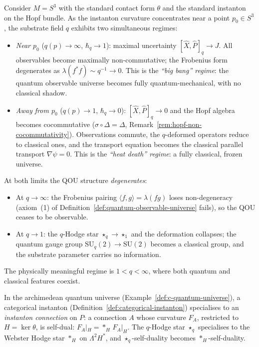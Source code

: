 \begin{example}
\label{ex:cosmological-limits}
Consider $M = S^3$ with the standard contact form $\theta$ and the
standard instanton on the Hopf bundle.  As the instanton curvature
concentrates near a point $p_0 \in S^3$, the substrate field $q$
exhibits two simultaneous regimes:
\begin{itemize}
  \item \emph{Near $p_0$} ($q(p) \to \infty$, $\hbar_q \to 1$):
        maximal uncertainty $[\hat{X},\hat{P}]_q \to J$.
        All observables become maximally non-commutative; the
        Frobenius form degenerates as
        $\lambda(f^* f) \sim q^{-1} \to 0$.
        This is the \emph{``big bang'' regime}: the quantum observable
        universe becomes fully quantum-mechanical, with no classical
        shadow.
  \item \emph{Away from $p_0$} ($q(p) \to 1$, $\hbar_q \to 0$):
        $[\hat{X},\hat{P}]_q \to 0$ and the Hopf algebra becomes
        cocommutative ($\sigma \circ \Delta = \Delta$,
        Remark~\ref{rem:hopf-non-cocommutativity}).  Observations
        commute, the $q$-deformed operators reduce to classical ones,
        and the transport equation becomes the classical parallel
        transport $\nabla\psi = 0$.  This is the \emph{``heat death''
        regime}: a fully classical, frozen universe.
\end{itemize}
At both limits the QOU structure \emph{degenerates}:
\begin{itemize}
  \item At $q \to \infty$: the Frobenius pairing
        $\langle f, g \rangle = \lambda(fg)$ loses non-degeneracy
        (axiom~(1) of Definition~\ref{def:quantum-observable-universe}
        fails), so the QOU ceases to be observable.
  \item At $q \to 1$: the $q$-Hodge star $\star_q \to \star_1$ and
        the deformation collapses; the quantum gauge group
        $\mathrm{SU}_q(2) \to \mathrm{SU}(2)$ becomes a classical
        group, and the substrate parameter carries no information.
\end{itemize}
The physically meaningful regime is $1 < q < \infty$, where
both quantum and classical features coexist.
\end{example}

\begin{example}
\label{def:instanton}
\leanok
In the archimedean quantum universe
(Example~\ref{def:c-quantum-universe}), a categorical instanton
(Definition~\ref{def:categorical-instanton}) specialises to an
\emph{instanton connection} on $P$: a connection $A$ whose
curvature $F_A$, restricted to $H = \ker\theta$, is self-dual:
$F_A|_H = {*_H}\,F_A|_H$.  The $q$-Hodge star $\star_q$ specialises
to the Webster Hodge star $*_H$ on $\Lambda^2 H^*$, and
$\star_q$-self-duality becomes $*_H$-self-duality.
\end{example}

